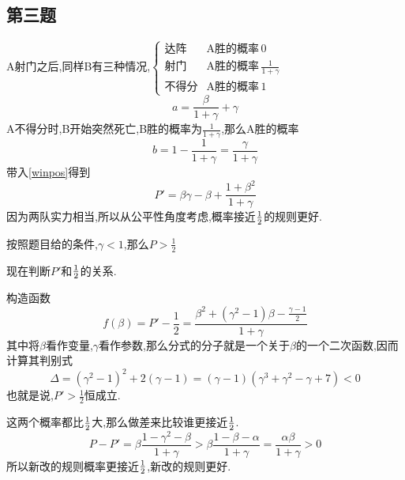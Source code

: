 \documentclass{ctexart}
\begin{document}
\subsection{第三题}
A射门之后,同样B有三种情况,$
\begin{cases}
  \text{达阵} & \text{A胜的概率}\,0 \\
  \text{射门} & \text{A胜的概率}\,\frac{1}{1 + \gamma} \\
  \text{不得分} & \text{A胜的概率}\,1
\end{cases}$
\begin{equation}
    a = \frac{\beta}{1 + \gamma} + \gamma
\end{equation}
A不得分时,B开始突然死亡,B胜的概率为$\frac{1}{1 + \gamma}$,那么A胜的概率
\begin{equation}
    b = 1 - \frac{1}{1 + \gamma} = \frac{\gamma}{1 + \gamma}
\end{equation}
带入\cref{winpos}得到
\begin{equation}
    P' = \beta\gamma - \beta + \frac{1 + \beta^2}{1 + \gamma}
\end{equation}
因为两队实力相当,所以从公平性角度考虑,概率接近$1 \over 2$的规则更好.

按照题目给的条件,$\gamma <  1$,那么$P >  \frac{1}{2}$

现在判断$P'$和$1 \over 2$的关系.

构造函数\begin{equation}
    f(\beta) = P' - \frac{1}{2} = \frac{\beta ^ 2 + (\gamma ^ 2 - 1)\beta - \frac{\gamma - 1}{2}}{1 + \gamma}
\end{equation}
其中将$\beta$看作变量,$\gamma$看作参数,那么分式的分子就是一个关于$\beta$的一个二次函数,因而计算其判别式
\begin{equation}
    \Delta=(\gamma^2-1)^2+2(\gamma-1)=(\gamma-1)(\gamma^3+\gamma^2-\gamma+7)<0
\end{equation}
也就是说,$P' > \frac{1}{2}$恒成立.

这两个概率都比$1\over2$大,那么做差来比较谁更接近$1\over2$.
\begin{equation}
    P - P' = \beta \frac{1 - \gamma^2  - \beta}{1 + \gamma} > \beta \frac{1 - \beta - \alpha}{1 + \gamma}= \frac{\alpha \beta}{1 + \gamma} > 0
\end{equation}
所以新改的规则概率更接近$1 \over 2$,新改的规则更好.
\end{document}
